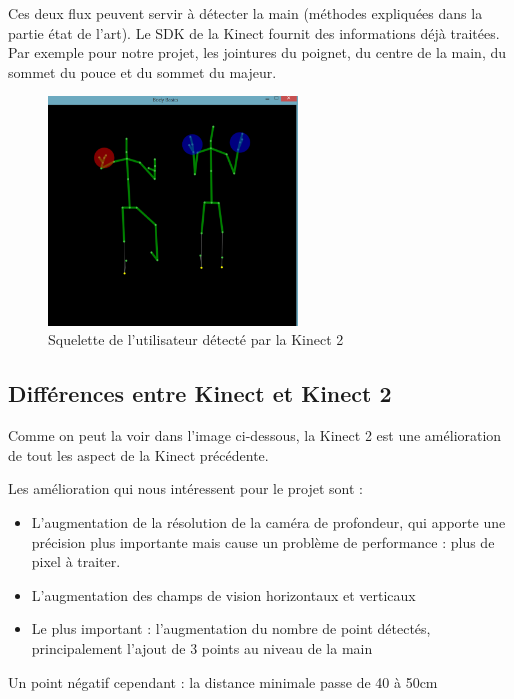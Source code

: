 Ces deux flux peuvent servir à détecter la main (méthodes expliquées dans la partie état de l'art).
Le SDK de la Kinect fournit des informations déjà traitées. 
Par exemple pour notre projet, les jointures du poignet, du centre de la main, du sommet du pouce et du sommet du majeur.

\begin{figure}[H]
\center
\includegraphics[width=250px]{images/kinec2_skel.png}
\caption{Squelette de l'utilisateur détecté par la Kinect 2}
\label{fig:skeleton_kinect2}
\end{figure}

\subsection{Différences entre Kinect et Kinect 2}

Comme on peut la voir dans l'image ci-dessous, la Kinect 2 est une amélioration de tout les aspect de la Kinect précédente.

Les amélioration qui nous intéressent pour le projet sont : 
\begin{itemize}
 \item L'augmentation de la résolution de la caméra de profondeur, qui apporte une précision plus importante mais cause un problème de performance : plus de pixel à traiter.
 \item L'augmentation des champs de vision horizontaux et verticaux
 \item Le plus important : l'augmentation du nombre de point détectés, principalement l'ajout de 3 points au niveau de la main
\end{itemize}

Un point négatif cependant : la distance minimale passe de 40 à 50cm 


